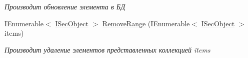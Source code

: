 \begin{DoxyCompactItemize}
\begin{DoxyCompactList}\small\item\em Производит обновление элемента в БД \end{DoxyCompactList}\item 
I\+Enumerable$<$ \hyperlink{interface_security_1_1_interfaces_1_1_model_1_1_i_sec_object}{I\+Sec\+Object} $>$ \hyperlink{class_security_1_1_entity_framework_1_1_collections_1_1_sec_object_collection_a709565a09ef599c45f519e9b5d226501}{Remove\+Range} (I\+Enumerable$<$ \hyperlink{interface_security_1_1_interfaces_1_1_model_1_1_i_sec_object}{I\+Sec\+Object} $>$ items)
\begin{DoxyCompactList}\small\item\em Производит удаление элементов представленных коллекцией items \end{DoxyCompactList}\end{DoxyCompactItemize}
